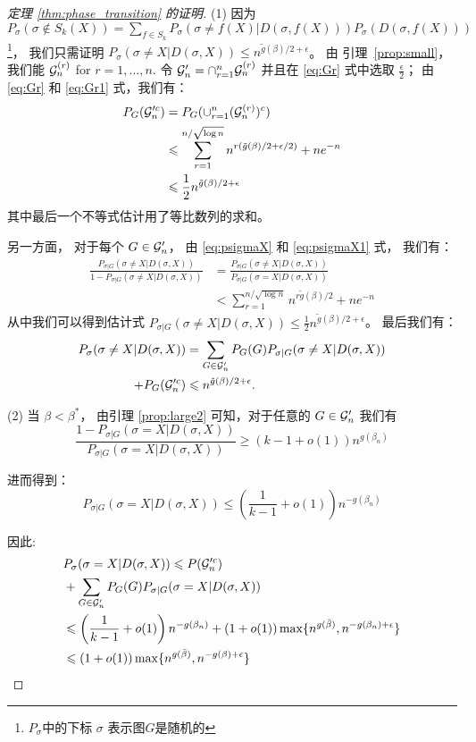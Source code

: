 \begin{proof}[定理 \ref{thm:phase_transition} 的证明]
	(1) 因为 $P_{\sigma}(\sigma \not \in S_k(X)) = \sum_{f\in S_k} P_{\sigma}(\sigma \neq f(X) | D(\sigma, f(X))) P_{\sigma}(D(\sigma, f(X)))$
  \footnote{$P_{\sigma}$中的下标 $\sigma$ 表示图$G$是随机的}，
	我们只需证明 $P_{\sigma}(\sigma \neq X | D(\sigma, X)) \leq  n^{\tilde{g}(\beta)/2 + \epsilon}$。
	由 \mbox{引理 \ref{prop:small}}， 我们能 $\mathcal{G}_n^{(r)}$ for $r=1,\dots, n$.
	令 $\mathcal{G}'_n = \cap_{r=1}^n \mathcal{G}_n^{(r)}$ 
  并且在 \eqref{eq:Gr} 式中选取 $\frac{\epsilon}{2}$；
  由 \eqref{eq:Gr} 和 \eqref{eq:Gr1} 式，我们有：
	\begin{align*}
	P_G(\mathcal{G}'^c_n) &= P_G(\cup_{r=1}^n (\mathcal{G}_n^{(r)})^c) \\
	&\leqslant \sum_{r=1}^{n/\sqrt{\log n } } n^{r(\tilde{g}(\beta)/2 + \epsilon/2)}  + n e^{-n} \\
	& \leqslant \frac{1}{2} n^{\tilde{g}(\beta)/2 + \epsilon}
	\end{align*}
	其中最后一个不等式估计用了等比数列的求和。

	另一方面， 对于每个 $G \in \mathcal{G}'_n$，
  由 \eqref{eq:psigmaX} 和 \eqref{eq:psigmaX1} 式，
	我们有：
	\begin{align*}
	\frac{P_{\sigma | G}(\sigma \neq X | D(\sigma, X))}{1-P_{\sigma | G}(\sigma \neq X | D(\sigma, X))} &= \frac{P_{\sigma | G}(\sigma \neq X | D(\sigma, X))}{P_{\sigma|G}(\sigma=X | D(\sigma, X))} \\
	&< \sum_{r=1}^{n/\sqrt{\log n }}  n^{r\tilde{g}(\beta)/2} + n e^{-n}
	\end{align*}
	从中我们可以得到估计式 $P_{\sigma | G}(\sigma \neq X | D(\sigma, X))\leq \frac{1}{2}n^{\tilde{g}(\beta)/2 + \epsilon}$。
	最后我们有： 
	\begin{align*}
	P_{\sigma}(\sigma \neq X|D(\sigma, X)) &= \sum_{G\in \mathcal{G}'_n} P_G(G)P_{\sigma |G}(\sigma \neq X | D(\sigma, X)) \\
	+ P_G(\mathcal{G}'^c_n)
	& \leqslant n^{\tilde{g}(\beta)/2 + \epsilon}.
	\end{align*}
	
	(2) 当 $\beta < \beta^*$，
  由引理 \ref{prop:large2} 可知，对于任意的 $G \in \mathcal{G}'_n$
	我们有
	$$
	\frac{1-P_{\sigma | G}(\sigma=X | D(\sigma, X))}{P_{\sigma | G}(\sigma=X | D(\sigma, X))}\geq (k-1+o(1))n^{g(\beta_n)}
	$$
	
	进而得到：
	$$
	P_{\sigma | G}(\sigma=X| D(\sigma, X)) \leq \left(\frac{1}{k-1}+o(1) \right) n^{-g(\beta_n)}
	$$
	
	因此:
	\begin{align*}
	&P_{\sigma}(\sigma=X| D(\sigma, X))  \leqslant  P(\mathcal{G}'^c_n) \\
	&+ \sum_{G\in \mathcal{G}'_n}P_G(G) P_{\sigma|G}(\sigma=X| D(\sigma, X)) \\
	& \leqslant \left(
    \frac{1}{k-1}+o(1) \right)
    n^{-g(\beta_n)} + (1+o(1)) \max\{n^{g(\bar{\beta})}, n^{- g(\beta_n) + \epsilon} \}\\
	& \leqslant (1+o(1)) \max\{n^{g(\bar{\beta})}, n^{-g(\beta) + \epsilon}  \}
	\end{align*}
	

\end{proof}
